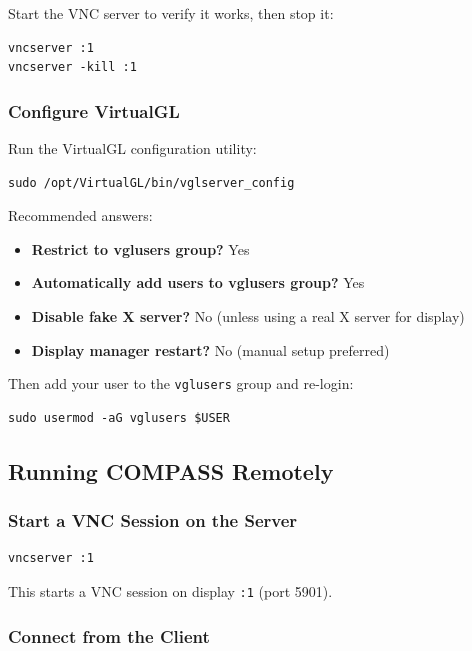 Start the VNC server to verify it works, then stop it:

\begin{lstlisting}
vncserver :1
vncserver -kill :1
\end{lstlisting}

\subsubsection{Configure VirtualGL}

Run the VirtualGL configuration utility:

\begin{lstlisting}
sudo /opt/VirtualGL/bin/vglserver_config
\end{lstlisting}

Recommended answers:

\begin{itemize}
\item \textbf{Restrict to vglusers group?} Yes
\item \textbf{Automatically add users to vglusers group?} Yes
\item \textbf{Disable fake X server?} No (unless using a real X server for display)
\item \textbf{Display manager restart?} No (manual setup preferred)
\end{itemize}

Then add your user to the \texttt{vglusers} group and re-login:

\begin{lstlisting}
sudo usermod -aG vglusers $USER
\end{lstlisting}

\subsection{Running COMPASS Remotely}

\subsubsection{Start a VNC Session on the Server}

\begin{lstlisting}
vncserver :1
\end{lstlisting}

This starts a VNC session on display \texttt{:1} (port 5901).

\subsubsection{Connect from the Client}

